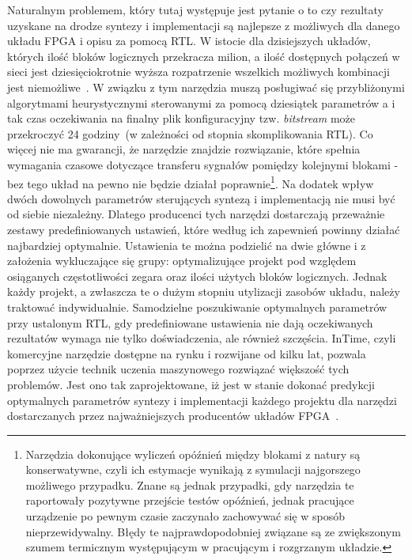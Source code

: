 Naturalnym problemem, który tutaj występuje jest pytanie o to czy rezultaty uzyskane na drodze syntezy i implementacji są najlepsze z możliwych dla danego układu FPGA i opisu za pomocą RTL. W istocie dla dzisiejszych układów, których ilość bloków logicznych przekracza milion, a ilość dostępnych połączeń w sieci jest dziesięciokrotnie wyższa rozpatrzenie wszelkich możliwych kombinacji jest niemożliwe~\cite{FPGA_SD}. W związku z tym narzędzia muszą posługiwać się przybliżonymi algorytmami heurystycznymi sterowanymi za pomocą dziesiątek parametrów a i tak czas oczekiwania na finalny plik konfiguracyjny tzw. \textit{bitstream} może przekroczyć 24 godziny~(w zależności od stopnia skomplikowania RTL). Co więcej nie ma gwarancji, że narzędzie znajdzie rozwiązanie, które spełnia wymagania czasowe dotyczące transferu sygnałów pomiędzy kolejnymi blokami - bez tego układ na pewno nie będzie działał poprawnie\footnote{Narzędzia dokonujące wyliczeń opóźnień między blokami z natury są konserwatywne, czyli ich estymacje wynikają z symulacji najgorszego możliwego przypadku. Znane są jednak przypadki, gdy narzędzia te raportowały pozytywne przejście testów opóźnień, jednak pracujące urządzenie po pewnym czasie zaczynało zachowywać się w sposób nieprzewidywalny. Błędy te najprawdopodobniej związane są ze zwiększonym szumem termicznym występującym w pracującym i rozgrzanym układzie. }. Na dodatek wpływ dwóch dowolnych parametrów sterujących syntezą i implementacją nie musi być od siebie niezależny. Dlatego producenci tych narzędzi dostarczają przeważnie zestawy predefiniowanych ustawień, które według ich zapewnień powinny działać najbardziej optymalnie. Ustawienia te można podzielić na dwie główne i z założenia wykluczające się grupy: optymalizujące projekt pod względem osiąganych częstotliwości zegara oraz ilości użytych bloków logicznych. Jednak każdy projekt, a zwłaszcza te o dużym stopniu utylizacji zasobów układu, należy traktować indywidualnie. Samodzielne poszukiwanie optymalnych parametrów przy ustalonym RTL, gdy predefiniowane ustawienia nie dają oczekiwanych rezultatów wymaga nie tylko doświadczenia, ale również szczęścia. InTime, czyli komercyjne narzędzie dostępne na rynku i rozwijane od kilku lat, pozwala poprzez użycie technik uczenia maszynowego rozwiązać większość tych problemów. Jest ono tak zaprojektowane, iż jest w stanie dokonać predykcji optymalnych parametrów syntezy i implementacji każdego projektu dla narzędzi dostarczanych przez najważniejszych producentów układów FPGA~\cite{InTime1}\cite{InTime2}\cite{InTime3}. 

